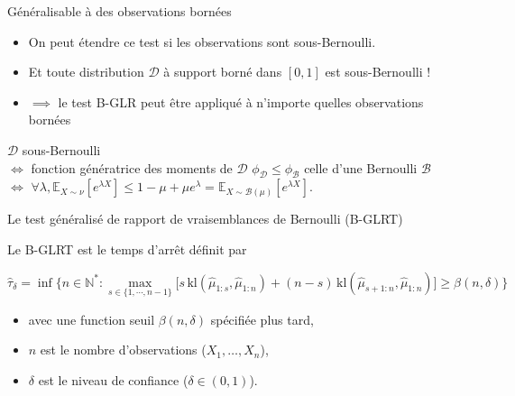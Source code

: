 \documentclass[11pt,french,ignorenonframetext,]{beamer}
\providecommand{\tightlist}{%
  \setlength{\itemsep}{0pt}\setlength{\parskip}{0pt}}
\begin{document}
\begin{frame}{Généralisable à des observations bornées \dCooley{}}

  \begin{itemize}
    \item
    On peut étendre ce test si les observations sont \alert{sous-Bernoulli}.
    \item
    Et toute distribution $\mathcal{D}$ à support borné dans $[0,1]$ est sous-Bernoulli !
    \item
    $\implies$ le test B-GLR peut être appliqué à n'importe quelles observations bornées \dCooley{}
  \end{itemize}

  \begin{tiny}
    $\mathcal{D}$ sous-Bernoulli \\
    $\Leftrightarrow$
    fonction génératrice des moments de $\mathcal{D}$ $\phi_{\mathcal{D}} \leq \phi_{\mathcal{B}}$ celle d'une Bernoulli $\mathcal{B}$ \\
    $\Leftrightarrow$
    $\forall \lambda, \mathbb{E}_{X\sim\nu}\left[e^{\lambda X}\right] \leq  1-\mu + \mu e^\lambda = \mathbb{E}_{X\sim \mathcal{B}(\mu)} [e^{\lambda X}]$.
  \end{tiny}

\end{frame}

\begin{frame}{Le test généralisé de rapport de vraisemblances de Bernoulli (B-GLRT)}

    Le \alert{B-GLRT} est le temps d'arrêt définit par
    \begin{small}
    \[ \widehat{\tau}_{\delta} = \inf \bigl\{ n \in \mathbb{N}^* : \max_{s \in \{1,\cdots,n-1\}} \bigl[s \, \mathrm{kl}\left(\widehat{\mu}_{1:s},\widehat{\mu}_{1:n}\right) + (n-s) \, \mathrm{kl}\left(\widehat{\mu}_{s+1:n},\widehat{\mu}_{1:n}\right)\bigr] \geq \beta(n,\delta) \bigr\} \]
    \vspace*{-10pt}
    \end{small}%
    \begin{itemize}\tightlist
      \item avec une \alert{function seuil} $\beta(n,\delta)$ spécifiée plus tard,
      \item $n$ est le nombre d'observations ($X_1,\dots,X_n$),
      \item $\delta$ est le niveau de confiance ($\delta\in(0,1)$).
    \end{itemize}%

\end{frame}
\end{document}
